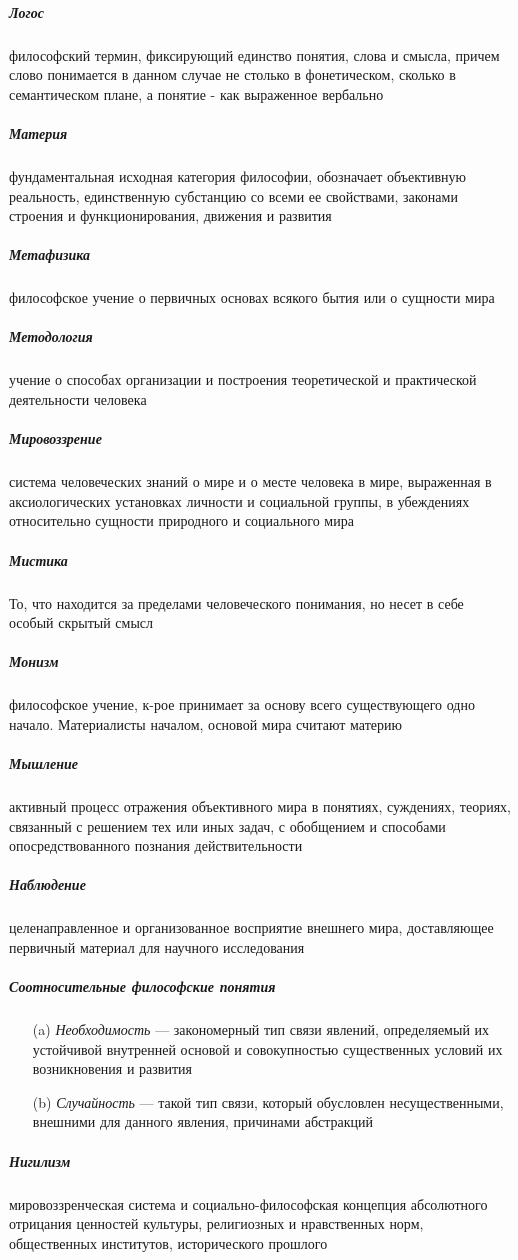 \documentclass[a4paper, 12pt]{article}
\theoremstyle{plain} %
\theoremstyle{definition} %
\theoremstyle{remark} %
\begin{document}
\subparagraph{Логос}
	философский термин, фиксирующий единство понятия, слова и смысла, причем слово понимается в данном случае не столько в фонетическом, сколько в семантическом плане, а понятие - как выраженное вербально

\subparagraph{Материя}
	 фундаментальная исходная категория философии, обозначает объективную реальность, единственную субстанцию со всеми ее свойствами, законами строения и функционирования, движения и развития

\subparagraph{Метафизика}
	 философское учение о первичных основах всякого бытия или о сущности мира

\subparagraph{Методология}
	учение о способах организации и построения теоретической и практической деятельности человека

\subparagraph{Мировоззрение}
	система человеческих знаний о мире и о месте человека в мире, выраженная в аксиологических установках личности и социальной группы, в убеждениях относительно сущности природного и социального мира

\subparagraph{Мистика}
	То, что находится за пределами человеческого понимания, но несет в себе особый скрытый смысл

\subparagraph{Монизм}
	философское учение, к-рое принимает за основу всего существующего одно начало. Материалисты началом, основой мира считают материю

\subparagraph{Мышление}
	активный процесс отражения объективного мира в понятиях, суждениях, теориях, связанный с решением тех или иных задач, с обобщением и способами опосредствованного познания действительности

\subparagraph{Наблюдение}
	 целенаправленное и организованное восприятие внешнего мира, доставляющее первичный материал для научного исследования

\subparagraph{Соотносительные философские понятия}
\begin{itemize}
	\item[(a)] \emph{Необходимость} --- закономерный тип связи явлений, определяемый их устойчивой внутренней основой и совокупностью существенных условий их возникновения и развития
	\item[(b)] \emph{Случайность} --- такой тип связи, который обусловлен несущественными, внешними для данного явления, причинами абстракций
\end{itemize}

\subparagraph{Нигилизм}
	мировоззренческая система и социально-философская концепция абсолютного отрицания ценностей культуры, религиозных и нравственных норм, общественных институтов, исторического прошлого
\end{document}
